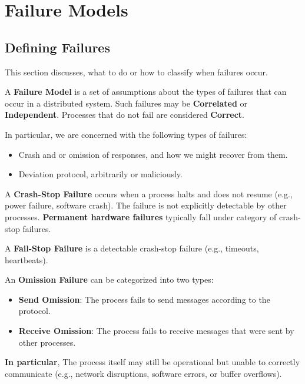 \newpage 
\section{Failure Models}
\subsection{Defining Failures}
This section discusses, what to do or how to classify when failures occur.

\begin{Def}

    A \textbf{Failure Model} is a set of assumptions about the types of failures that can occur in a distributed system.
    Such failures may be \textbf{Correlated} or \textbf{Independent}. Processes that do not fail are considered \textbf{Correct}.
\end{Def}

\noindent
In particular, we are concerned with the following types of failures:
\begin{itemize}
    \item Crash and or omission of responses, and how we might recover from them.
    \item Deviation protocol, arbitrarily or maliciously.
\end{itemize}
\begin{Def}
    
    \label{def:crash-stop}
    A \textbf{Crash-Stop Failure} occurs when a process halts and does not resume (e.g., power failure, software crash). The failure is not explicitly detectable by other processes.
    \textbf{Permanent hardware failures} typically fall under category of crash-stop failures.\\
\end{Def}

\noindent

\begin{Def}
    
    A \textbf{Fail-Stop Failure} is a detectable crash-stop failure (e.g., timeouts, heartbeats).
\end{Def}


\begin{Def}

    An \textbf{Omission Failure} can be categorized into two types:

    \begin{itemize}
        \item \textbf{Send Omission}: The process fails to send messages according to the protocol.
        \item \textbf{Receive Omission}: The process fails to receive messages that were sent by other processes.
    \end{itemize}

    \noindent
    \textbf{In particular}, The process itself may still be operational but unable to correctly communicate (e.g., network disruptions, software errors, or buffer overflows).
\end{Def}

